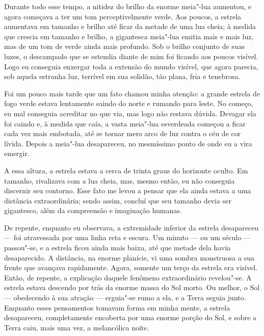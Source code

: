 Durante todo esse tempo, a nitidez do brilho da enorme meia"-lua aumentou, e agora começava a ter um tom
perceptivelmente verde. Aos poucos, a estrela aumentava em tamanho e brilho até ficar da metade de uma lua cheia; à
medida que crescia em tamanho e brilho, a gigantesca meia"-lua emitia mais e mais luz, mas de um tom de verde ainda mais
profundo. Sob o brilho conjunto de suas luzes, o descampado que se estendia diante de mim foi ficando aos poucos
visível. Logo eu conseguia enxergar toda a extensão do mundo visível, que agora parecia, sob aquela estranha luz,
terrível em sua solidão, tão plana, fria e tenebrosa.

Foi um pouco mais tarde que um fato chamou minha atenção: a grande estrela de fogo verde estava lentamente saindo do
norte e rumando para leste. No começo, eu mal conseguia acreditar no que via, mas logo não restava dúvida. Devagar
ela foi caindo e, à medida que caía, a vasta meia"-lua esverdeada começou a ficar cada vez mais embotada, até se tornar
mero arco de luz contra o céu de cor lívida. Depois a meia"-lua desapareceu, no mesmíssimo ponto de onde eu a vira
emergir.

A essa altura, a estrela estava a cerca de trinta graus do horizonte oculto. Em tamanho, rivalizava com a lua cheia,
mas, mesmo então, eu não conseguia discernir seu contorno. Esse fato me levou a pensar que ela ainda estava a uma
distância extraordinária; sendo assim, concluí que seu tamanho devia ser gigantesco, além da compreensão e imaginação
humanas.

De repente, enquanto eu observava, a extremidade inferior da estrela desapareceu --- foi atravessada por uma linha reta e
escura. Um minuto --- ou um século --- passou"-se, e a estrela ficou ainda mais baixa, até que metade dela havia
desaparecido. A distância, na enorme planície, vi uma sombra monstruosa a sua frente que avançava rapidamente. Agora,
somente um terço da estrela era visível. Então, de repente, a explicação daquele fenômeno extraordinário revelou"-se.
A estrela estava descendo por trás da enorme massa do Sol morto. Ou melhor, o Sol --- obedecendo à sua atração ---
erguia"-se rumo a ela, e a Terra seguia junto.
Enquanto esses pensamentos tomavam forma em minha mente, a estrela
desapareceu, completamente encoberta por uma enorme porção do Sol, e sobre a Terra caiu, mais uma vez, a melancólica
noite.

